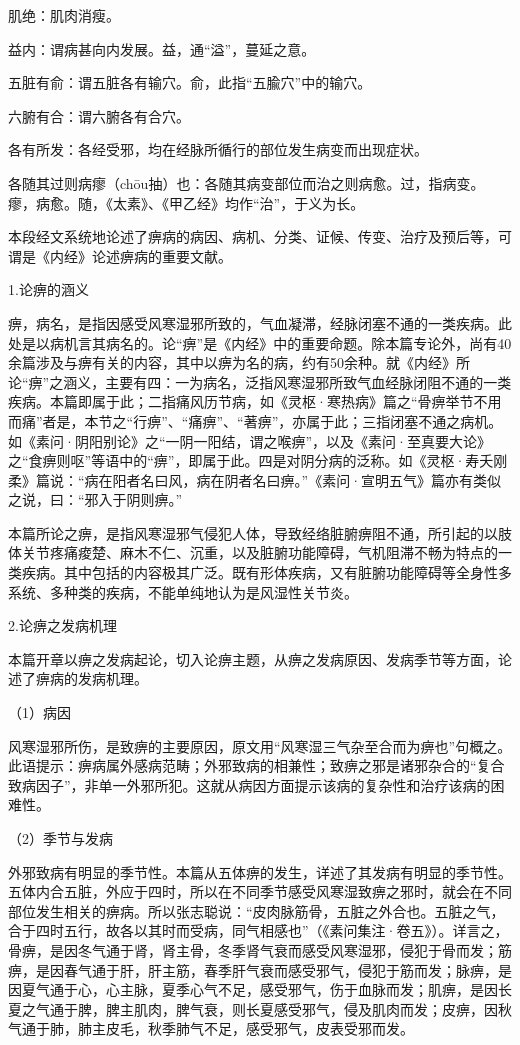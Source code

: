 \documentclass[draft,12pt]{ctexbook}
\begin{document}
\begin{jiaozhu}
  \item 肌绝：肌肉消瘦。
  \item 益内：谓病甚向内发展。益，通“溢”，蔓延之意。
  \item 五脏有俞：谓五脏各有输穴。俞，此指“五腧穴”中的输穴。
  \item 六腑有合：谓六腑各有合穴。
  \item 各有所发：各经受邪，均在经脉所循行的部位发生病变而出现症状。
  \item 各随其过则病瘳（chōu抽）也：各随其病变部位而治之则病愈。过，指病变。瘳，病愈。随，《太素》、《甲乙经》均作“治”，于义为长。
\end{jiaozhu}


本段经文系统地论述了痹病的病因、病机、分类、证候、传变、治疗及预后等，可谓是《内经》论述痹病的重要文献。

1.论痹的涵义

痹，病名，是指因感受风寒湿邪所致的，气血凝滞，经脉闭塞不通的一类疾病。此处是以病机言其病名的。论“痹”是《内经》中的重要命题。除本篇专论外，尚有40余篇涉及与痹有关的内容，其中以痹为名的病，约有50余种。就《内经》所论“痹”之涵义，主要有四：一为病名，泛指风寒湿邪所致气血经脉闭阻不通的一类疾病。本篇即属于此；二指痛风历节病，如《灵枢·寒热病》篇之“骨痹举节不用而痛”者是，本节之“行痹”、“痛痹”、“著痹”，亦属于此；三指闭塞不通之病机。如《素问·阴阳别论》之“一阴一阳结，谓之喉痹”，以及《素问·至真要大论》之“食痹则呕”等语中的“痹”，即属于此。四是对阴分病的泛称。如《灵枢·寿夭刚柔》篇说：“病在阳者名曰风，病在阴者名曰痹。”《素问·宣明五气》篇亦有类似之说，曰：“邪入于阴则痹。”

本篇所论之痹，是指风寒湿邪气侵犯人体，导致经络脏腑痹阻不通，所引起的以肢体关节疼痛痠楚、麻木不仁、沉重，以及脏腑功能障碍，气机阻滞不畅为特点的一类疾病。其中包括的内容极其广泛。既有形体疾病，又有脏腑功能障碍等全身性多系统、多种类的疾病，不能单纯地认为是风湿性关节炎。

2.论痹之发病机理

本篇开章以痹之发病起论，切入论痹主题，从痹之发病原因、发病季节等方面，论述了痹病的发病机理。

（1）病因

风寒湿邪所伤，是致痹的主要原因，原文用“风寒湿三气杂至合而为痹也”句概之。此语提示：痹病属外感病范畴；外邪致病的相兼性；致痹之邪是诸邪杂合的“复合致病因子”，非单一外邪所犯。这就从病因方面提示该病的复杂性和治疗该病的困难性。

（2）季节与发病

外邪致病有明显的季节性。本篇从五体痹的发生，详述了其发病有明显的季节性。五体内合五脏，外应于四时，所以在不同季节感受风寒湿致痹之邪时，就会在不同部位发生相关的痹病。所以张志聪说：“皮肉脉筋骨，五脏之外合也。五脏之气，合于四时五行，故各以其时而受病，同气相感也”（《素问集注·卷五》）。详言之，骨痹，是因冬气通于肾，肾主骨，冬季肾气衰而感受风寒湿邪，侵犯于骨而发；筋痹，是因春气通于肝，肝主筋，春季肝气衰而感受邪气，侵犯于筋而发；脉痹，是因夏气通于心，心主脉，夏季心气不足，感受邪气，伤于血脉而发；肌痹，是因长夏之气通于脾，脾主肌肉，脾气衰，则长夏感受邪气，侵及肌肉而发；皮痹，因秋气通于肺，肺主皮毛，秋季肺气不足，感受邪气，皮表受邪而发。
\end{document}
